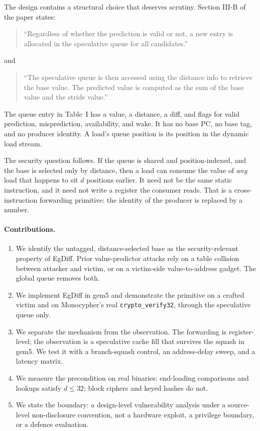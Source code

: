 \documentclass[conference]{IEEEtran}
\newcommand{\code}[1]{\texttt{\small #1}}
\begin{document}
The design contains a structural choice that deserves scrutiny.
Section III-B of the paper states:

\begin{quote}\small
``Regardless of whether the prediction is valid or not, a new entry is
allocated in the speculative queue for all candidates.''
\end{quote}

and

\begin{quote}\small
``The speculative queue is then accessed using the distance info to
retrieve the base value. The predicted value is computed as the sum of
the base value and the stride value.''
\end{quote}

The queue entry in Table~I has a value, a distance, a diff, and flags
for valid prediction, misprediction, availability, and wake. It has no
base PC, no base tag, and no producer identity. A load's queue position
is its position in the dynamic load stream.

The security question follows. If the queue is shared and
position-indexed, and the base is selected only by distance, then a load
can consume the value of \emph{any} load that happens to sit $d$
positions earlier. It need not be the same static instruction, and it
need not write a register the consumer reads. That is a cross-instruction
forwarding primitive: the identity of the producer is replaced by a
number.

\paragraph{Contributions.}
\begin{enumerate}
\item We identify the untagged, distance-selected base as the
security-relevant property of EgDiff. Prior value-predictor attacks rely
on a table collision between attacker and victim, or on a victim-side
value-to-address gadget. The global queue removes both.
\item We implement EgDiff in gem5 and demonstrate the primitive on a
crafted victim and on Monocypher's real \code{crypto\_verify32}, through
the speculative queue only.
\item We separate the mechanism from the observation. The forwarding is
register-level; the observation is a speculative cache fill that
survives the squash in gem5. We test it with a branch-squash control, an
address-delay sweep, and a latency matrix.
\item We measure the precondition on real binaries: end-loading
comparisons and lookups satisfy $d\le 32$; block ciphers and keyed
hashes do not.
\item We state the boundary: a design-level vulnerability analysis under
a source-level non-disclosure convention, not a hardware exploit, a
privilege boundary, or a defence evaluation.
\end{enumerate}
\end{document}
